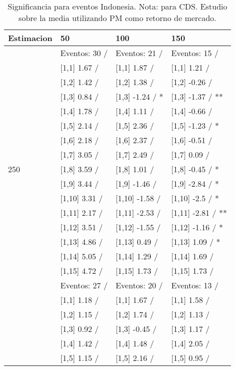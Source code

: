 \begin{table}

\caption{Significancia para eventos Indonesia. Nota: para CDS. Estudio sobre la media utilizando PM como retorno de mercado.}
\centering
\begin{tabular}[t]{llll}
\toprule
Estimacion & 50 & 100 & 150\\
\midrule
 & Eventos:  30 / & Eventos:  21 / & Eventos:  15 /\\
 & {}[1,1] 1.67  / & {}[1,1] 1.87  / & {}[1,1] 1.21  /\\
 & {}[1,2] 1.42  / & {}[1,2] 1.38  / & {}[1,2] -0.26  /\\
 & {}[1,3] 0.84  / & {}[1,3] -1.24  / * & {}[1,3] -1.37  / **\\
 & {}[1,4] 1.78  / & {}[1,4] 1.11  / & {}[1,4] -0.66  /\\
\addlinespace
 & {}[1,5] 2.14  / & {}[1,5] 2.36  / & {}[1,5] -1.23  / *\\
 & {}[1,6] 2.18  / & {}[1,6] 2.37  / & {}[1,6] -0.51  /\\
 & {}[1,7] 3.05  / & {}[1,7] 2.49  / & {}[1,7] 0.09  /\\
250 & {}[1,8] 3.59  / & {}[1,8] 1.01  / & {}[1,8] -0.45  / *\\
 & {}[1,9] 3.44  / & {}[1,9] -1.46  / & {}[1,9] -2.84  / *\\
\addlinespace
 & {}[1,10] 3.31  / & {}[1,10] -1.58  / & {}[1,10] -2.5  / *\\
 & {}[1,11] 2.17  / & {}[1,11] -2.53  / & {}[1,11] -2.81  / **\\
 & {}[1,12] 3.51  / & {}[1,12] -1.55  / & {}[1,12] -1.16  / *\\
 & {}[1,13] 4.86  / & {}[1,13] 0.49  / & {}[1,13] 1.09  / *\\
 & {}[1,14] 5.05  / & {}[1,14] 1.29  / & {}[1,14] 1.69  /\\
\addlinespace
 & {}[1,15] 4.72  / & {}[1,15] 1.73  / & {}[1,15] 1.73  /\\
 & Eventos:  27 / & Eventos:  20 / & Eventos:  13 /\\
 & {}[1,1] 1.18  / & {}[1,1] 1.67  / & {}[1,1] 1.58  /\\
 & {}[1,2] 1.15  / & {}[1,2] 1.74  / & {}[1,2] 1.13  /\\
 & {}[1,3] 0.92  / & {}[1,3] -0.45  / & {}[1,3] 1.17  /\\
\addlinespace
 & {}[1,4] 1.42  / & {}[1,4] 1.48  / & {}[1,4] 2.05  /\\
 & {}[1,5] 1.15  / & {}[1,5] 2.16  / & {}[1,5] 0.95  /\\

\end{tabular}
\end{table}
